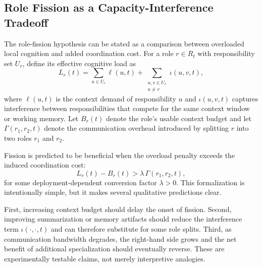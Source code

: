 
\subsection{Role Fission as a Capacity-Interference Tradeoff}

The role-fission hypothesis can be stated as a comparison between overloaded local cognition and added coordination cost. For a role $r \in R_t$ with responsibility set $U_r$, define its effective cognitive load as
\begin{equation}
L_r(t) = \sum_{u \in U_r} \ell(u,t) + \sum_{\substack{u,v \in U_r \\ u \neq v}} \iota(u,v,t),
\end{equation}
where $\ell(u,t)$ is the context demand of responsibility $u$ and $\iota(u,v,t)$ captures interference between responsibilities that compete for the same context window or working memory. Let $B_r(t)$ denote the role's usable context budget and let $\Gamma(r_1,r_2,t)$ denote the communication overhead introduced by splitting $r$ into two roles $r_1$ and $r_2$.

Fission is predicted to be beneficial when the overload penalty exceeds the induced coordination cost:
\begin{equation}
L_r(t) - B_r(t) > \lambda \, \Gamma(r_1,r_2,t),
\end{equation}
for some deployment-dependent conversion factor $\lambda > 0$. This formalization is intentionally simple, but it makes several qualitative predictions clear.

First, increasing context budget should delay the onset of fission. Second, improving summarization or memory artifacts should reduce the interference term $\iota(\cdot,\cdot,t)$ and can therefore substitute for some role splits. Third, as communication bandwidth degrades, the right-hand side grows and the net benefit of additional specialization should eventually reverse. These are experimentally testable claims, not merely interpretive analogies.


